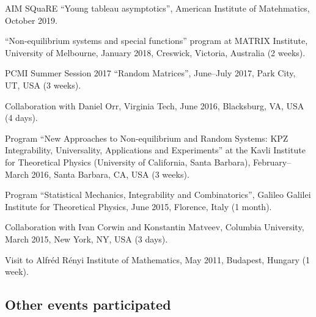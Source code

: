 \documentclass[letterpaper,11pt]{article}
\begin{document}
\begin{etaremune}
	\item 
	AIM SQuaRE ``Young tableau asymptotics'', American Institute of Matehmatics, 
	October 2019.
	\item 
		``Non-equilibrium systems and special functions'' program at MATRIX Institute,
		University of Melbourne, 
		January 2018, 
		Creswick, Victoria, Australia (2 weeks).
	\item
	      PCMI Summer Session 2017 ``Random Matrices'', June--July 2017,
	      Park City, UT, USA (3 weeks).
	\item
	      Collaboration with Daniel Orr, Virginia Tech, June 2016,
	      Blacksburg, VA, USA (4 days).
	\item
	      Program ``New Approaches to Non-equilibrium and Random Systems:
	      KPZ Integrability, Universality, Applications and Experiments'' at the Kavli
	      Institute for Theoretical Physics (University of California, Santa Barbara),
	      February--March 2016, Santa Barbara, CA, USA (3 weeks).
	\item
	      Program ``Statistical Mechanics, Integrability and
	      Combinatorics'', Galileo Galilei Institute for Theoretical Physics, June 2015,
	      Florence, Italy (1 month).
	\item
	      Collaboration with Ivan Corwin and Konstantin Matveev, Columbia
	      University, March 2015, New York, NY, USA (3 days).
	\item
	      Visit to Alfr\'ed R\'enyi Institute of Mathematics, May 2011,
	      Budapest, Hungary (1 week).
\end{etaremune}

\subsection*{Other events participated}
\end{document}

